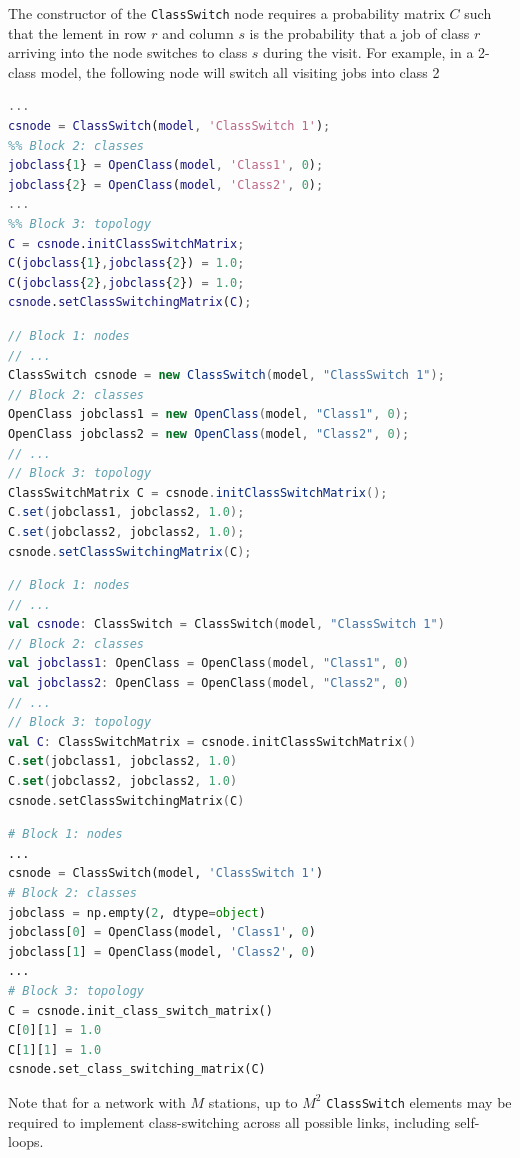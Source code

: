 The constructor of the \texttt{ClassSwitch} node requires a probability matrix $C$ such that the lement in row $r$ and column $s$ is the probability that a job of class $r$ arriving into the node switches to class $s$ during the visit. For example, in a 2-class model, the following node will switch all visiting jobs into class 2
\begin{MATLAB}
\begin{lstlisting}[language = matlab]
%% Block 1: nodes
...
csnode = ClassSwitch(model, 'ClassSwitch 1');
%% Block 2: classes
jobclass{1} = OpenClass(model, 'Class1', 0);
jobclass{2} = OpenClass(model, 'Class2', 0);
...
%% Block 3: topology
C = csnode.initClassSwitchMatrix; 
C(jobclass{1},jobclass{2}) = 1.0;
C(jobclass{2},jobclass{2}) = 1.0;
csnode.setClassSwitchingMatrix(C);
\end{lstlisting}
\end{MATLAB}
\begin{JAVA}
\begin{lstlisting}[language = java, basicstyle=\ttfamily\scriptsize]
// Block 1: nodes
// ...
ClassSwitch csnode = new ClassSwitch(model, "ClassSwitch 1");
// Block 2: classes
OpenClass jobclass1 = new OpenClass(model, "Class1", 0);
OpenClass jobclass2 = new OpenClass(model, "Class2", 0);
// ...
// Block 3: topology
ClassSwitchMatrix C = csnode.initClassSwitchMatrix(); 
C.set(jobclass1, jobclass2, 1.0);
C.set(jobclass2, jobclass2, 1.0);
csnode.setClassSwitchingMatrix(C);
\end{lstlisting}
\end{JAVA}
\begin{KOTLIN}
\begin{lstlisting}[language = kotlin, basicstyle=\ttfamily\scriptsize]
// Block 1: nodes
// ...
val csnode: ClassSwitch = ClassSwitch(model, "ClassSwitch 1")
// Block 2: classes
val jobclass1: OpenClass = OpenClass(model, "Class1", 0)
val jobclass2: OpenClass = OpenClass(model, "Class2", 0)
// ...
// Block 3: topology
val C: ClassSwitchMatrix = csnode.initClassSwitchMatrix() 
C.set(jobclass1, jobclass2, 1.0)
C.set(jobclass2, jobclass2, 1.0)
csnode.setClassSwitchingMatrix(C)
\end{lstlisting}
\end{KOTLIN}
\begin{PYTHON}
\begin{lstlisting}[language = python]
# Block 1: nodes
...
csnode = ClassSwitch(model, 'ClassSwitch 1')
# Block 2: classes
jobclass = np.empty(2, dtype=object)
jobclass[0] = OpenClass(model, 'Class1', 0)
jobclass[1] = OpenClass(model, 'Class2', 0)
...
# Block 3: topology
C = csnode.init_class_switch_matrix() 
C[0][1] = 1.0
C[1][1] = 1.0
csnode.set_class_switching_matrix(C)
\end{lstlisting}
\end{PYTHON}
Note that for a network with $M$ stations, up to $M^2$ \texttt{ClassSwitch} elements may be required to implement class-switching across all possible links, including self-loops. 

